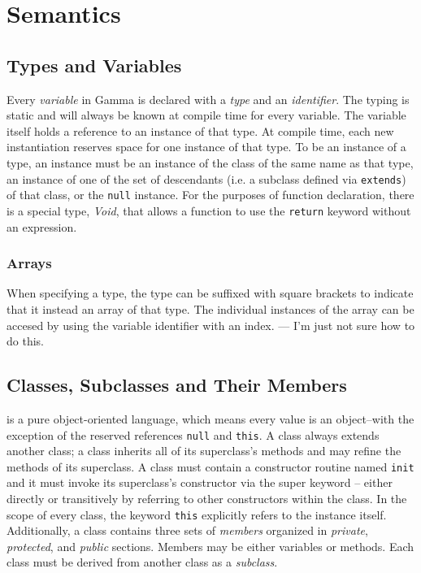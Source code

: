 \section{Semantics}

\subsection{Types and Variables}
Every \textit{variable} in Gamma is declared with a \textit{type} and an \textit{identifier}. The typing is static and will always be known at compile time for every variable. The variable itself holds a reference to an instance of that type. At compile time, each new instantiation reserves space for one instance of that type. To be an instance of a type, an instance must be an instance of the class of the same name as that type, an instance of one of the set of descendants (i.e. a subclass defined via \verb!extends!) of that class, or the {\tt null} instance. For the purposes of function declaration, there is a special type, \textit{Void}, that allows a function to use the \verb!return! keyword without an expression.

\subsubsection{Arrays}
When specifying a type, the type can be suffixed with square brackets to indicate that it instead an array of that type. The individual instances of the array can be accesed by using the variable identifier with an index. --- I'm just not sure how to do this.

\subsection{Classes, Subclasses and Their Members}
\Lang{} is a pure object-oriented language, which means every value is an object--with the exception of the reserved references \verb!null! and \verb!this!. A class always extends another class; a class inherits all of its superclass's methods and may refine the methods of its superclass. A class must contain a constructor routine named {\tt init} and it must invoke its superclass's constructor via the super keyword -- either directly or transitively by referring to other constructors within the class. In the scope of every class, the keyword \verb!this! explicitly refers to the instance itself. Additionally, a class contains three sets of \textit{members} organized in \textit{private}, \textit{protected}, and \textit{public} sections. Members may be either variables or methods. Each class must be derived from another class as a \textit{subclass}.

